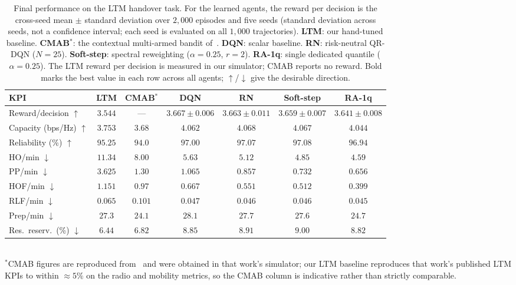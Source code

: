\documentclass[conference]{IEEEtran}
\begin{document}
\begin{table}[t]
\caption{Final performance on the LTM handover task. For the learned agents, the
reward per decision is the cross-seed mean $\pm$ standard deviation over
$2{,}000$ episodes and five seeds (standard deviation across seeds, not a
confidence interval; each seed is evaluated on all $1{,}000$ trajectories).
\textbf{LTM}: our hand-tuned baseline. \textbf{CMAB}$^{*}$: the contextual
multi-armed bandit of~\cite{cmab_ho}. \textbf{DQN}: scalar baseline. \textbf{RN}: risk-neutral QR-DQN
($N{=}25$). \textbf{Soft-step}: spectral reweighting ($\alpha{=}0.25$, $r{=}2$).
\textbf{RA-1q}: single dedicated quantile ($\alpha{=}0.25$). The LTM reward per
decision is measured in our simulator; CMAB reports no reward. Bold marks the best
value in each row across all agents; $\uparrow$/$\downarrow$ give the desirable
direction.}
\label{tab:final}
\centering
\setlength{\tabcolsep}{5pt}
\begin{tabular}{|l|c|c|c|c|c|c|}
\hline
\textbf{KPI} & \textbf{LTM} & \textbf{CMAB}$^{*}$ & \textbf{DQN} & \textbf{RN} & \textbf{Soft-step} & \textbf{RA-1q} \\
\hline
Reward/decision $\uparrow$          & $3.544$ & --- & $\mathbf{3.667{\pm}0.006}$ & $3.663{\pm}0.011$ & $3.659{\pm}0.007$ & $3.641{\pm}0.008$ \\
Capacity (bps/Hz) $\uparrow$        & $3.753$ & $3.68$ & $4.062$ & $\mathbf{4.068}$ & $4.067$ & $4.044$ \\
Reliability (\%) $\uparrow$         & $95.25$ & $94.0$ & $97.00$ & $97.07$ & $\mathbf{97.08}$ & $96.94$ \\
HO/min $\downarrow$                 & $11.34$ & $8.00$ & $5.63$ & $5.12$ & $4.85$ & $\mathbf{4.59}$ \\
PP/min $\downarrow$                 & $3.625$ & $1.30$ & $1.065$ & $0.857$ & $0.732$ & $\mathbf{0.656}$ \\
HOF/min $\downarrow$                & $1.151$ & $0.97$ & $0.667$ & $0.551$ & $0.512$ & $\mathbf{0.399}$ \\
RLF/min $\downarrow$                & $0.065$ & $0.101$ & $0.047$ & $0.046$ & $0.046$ & $\mathbf{0.045}$ \\
Prep/min $\downarrow$               & $27.3$ & $\mathbf{24.1}$ & $28.1$ & $27.7$ & $27.6$ & $24.7$ \\
Res.\ reserv.\ (\%) $\downarrow$    & $\mathbf{6.44}$ & $6.82$ & $8.85$ & $8.91$ & $9.00$ & $8.82$ \\
\hline
\end{tabular}
{\footnotesize\\[2pt]$^{*}$CMAB figures are reproduced from~\cite{cmab_ho} and were
obtained in that work's simulator; our LTM baseline reproduces that work's
published LTM KPIs to within ${\approx}5\%$ on the radio and mobility metrics, so
the CMAB column is indicative rather than strictly comparable.}
\end{table}
\end{document}
